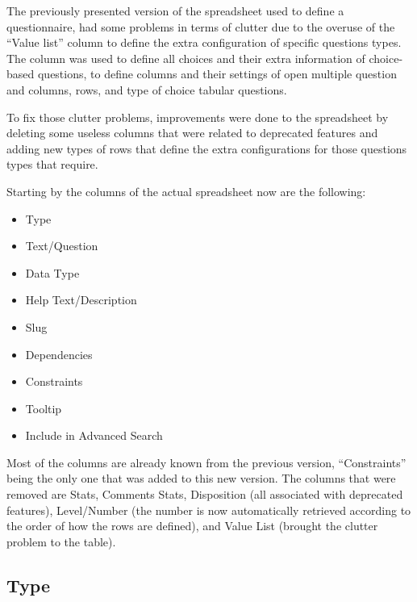 
The previously presented version of the spreadsheet used to define a questionnaire, had some problems in terms of clutter due to the overuse of the ``Value list'' column to define the extra configuration of specific questions types.
The column was used to define all choices and their extra information of choice-based questions, to define columns and their settings of open multiple question and columns, rows, and type of choice tabular questions.

To fix those clutter problems, improvements were done to the spreadsheet by deleting some useless columns that were related to deprecated features and adding new types of rows that define the extra configurations for those questions types that require.

Starting by the columns of the actual spreadsheet now are the following:

\begin{itemize}
    \item Type
    \item Text/Question
    \item Data Type
    \item Help Text/Description
    \item Slug
    \item Dependencies
    \item Constraints
    \item Tooltip
    \item Include in Advanced Search
\end{itemize}

Most of the columns are already known from the previous version, ``Constraints'' being the only one that was added to this new version.
The columns that were removed are Stats, Comments Stats, Disposition (all associated with deprecated features), Level/Number (the number is now automatically retrieved according to the order of how the rows are defined), and Value List (brought the clutter problem to the table).

\subsection*{Type}

